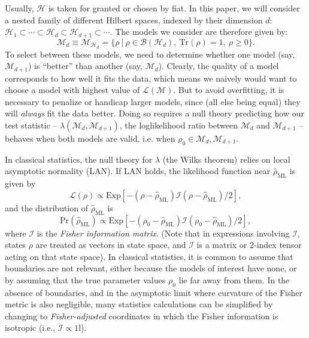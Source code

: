 \documentclass[aps,pra, twocolumn]{revtex4-1}
\newcommand{\M}{\mathcal{M}}
\newcommand{\cH}{\mathcal{H}}
\newcommand{\cL}{\mathcal{L}}
\newcommand{\Id}{\mathbb{I}}
\def\Id{1\!\mathrm{l}}
\newcommand{\rhohat}{\hat{\rho}}
\begin{document}
Usually, $\cH$ is taken for granted or chosen by fiat.  In this paper, we will consider a nested family of different Hilbert spaces, indexed by their dimension $d$: $\cH_{1}  \subset \cdots \subset \cH_{d} \subset \cH_{d+1} \subset \cdots$.  The models we consider are therefore given by:
\begin{equation}
\M_{d} \equiv \mathcal{M}_{\cH_{d}} = \{\rho~|~\rho \in \mathcal{B}(\mathcal{H}_{d}),~\mathrm{Tr}(\rho) =1,~\rho \geq 0\}.
\end{equation}
To select between these models, we need to determine whether one model (say, $\M_{d + 1}$) is ``better'' than another (say, $\M_{d}$).  Clearly, the quality of a model corresponds to how well it fits the data, which means we naively would want to choose a model with highest value of $\cL(\M)$.
 But to avoid overfitting, it is necessary to penalize or handicap larger models, since (all else being equal) they will \emph{always} fit the data better.  Doing so requires a null theory predicting how our test statistic -- $\lambda(\M_{d}, \M_{d+1})$, the loglikelihood ratio between $\M_d$ and $\M_{d+1}$ -- behaves when both models are valid, i.e. when $\rho_{0} \in \M_{d},\M_{d + 1}$.

In classical statistics, the null theory for $\lambda$ (the Wilks theorem) relies on local asymptotic normality (LAN).  If LAN holds, the likelihood function near $\rhohat_{\mathrm{ML}}$ is given by
\begin{equation}
\mathcal{L}(\rho) \propto \text{Exp}\left[-(\rho - \rhohat_{\mathrm{ML}})\mathcal{I}(\rho - \rhohat_{\mathrm{ML}})/2\right],
\end{equation}
and the distribution of $\rhohat_{\mathrm{ML}}$ is
\begin{equation}
\mathrm{Pr}(\rhohat_{\mathrm{ML}}) \propto \text{Exp}\left[-(\rho_{0} - \rhohat_{\mathrm{ML}})\mathcal{I}(\rho_{0} - \rhohat_{\mathrm{ML}})/2\right],
\end{equation}
where $\mathcal{I}$ is the \emph{Fisher information matrix}.  (Note that in expressions involving $\mathcal{I}$, states $\rho$ are treated as vectors in state space, and $\mathcal{I}$ is a matrix or 2-index tensor acting on that state space).  In classical statistics, it is common to assume that boundaries are not relevant, either because the models of interest have none, or by assuming that the true parameter values $\rho_{0}$ lie far away from them.  In the absence of boundaries, and in the asymptotic limit where curvature of the Fisher metric is also negligible, many statistics calculations can be simplified by changing to \emph{Fisher-adjusted} coordinates in which the Fisher information is isotropic (i.e., $\mathcal{I}\propto\Id$).
\end{document}
